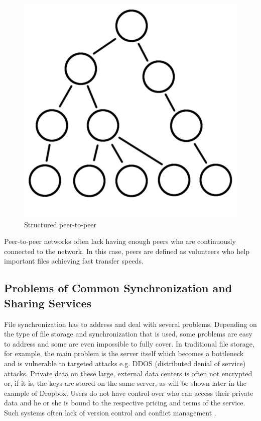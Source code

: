 \begin{enumerate}
\begin{figure}[H]
\begin{center}
		\includegraphics[scale=0.2]{Talk5/structured_p2p.PNG}
		\end{center}
		\caption{Structured peer-to-peer}
		\label{structured_p2p}
	\end{figure}
\end{enumerate}

Peer-to-peer networks often lack having enough peers who are continuously connected to the network. In this case, peers are defined as volunteers who help important files achieving fast transfer speeds.

\subsection{Problems of Common Synchronization and Sharing Services}
File synchronization has to address and deal with several problems. Depending on the type of file storage and synchronization that is used, some problems are easy to address and some are even impossible to fully cover. In traditional file storage, for example, the main problem is the server itself which becomes a bottleneck and is vulnerable to targeted attacks e.g. DDOS (distributed denial of service) attacks. Private data on these large, external data centers is often not encrypted or, if it is, the keys are stored on the same server, as will be shown later in the example of Dropbox. Users do not have control over who can access their private data and he or she is bound to the respective pricing and terms of the service. Such systems often lack of version control and conflict management \cite{hive2hive}.


